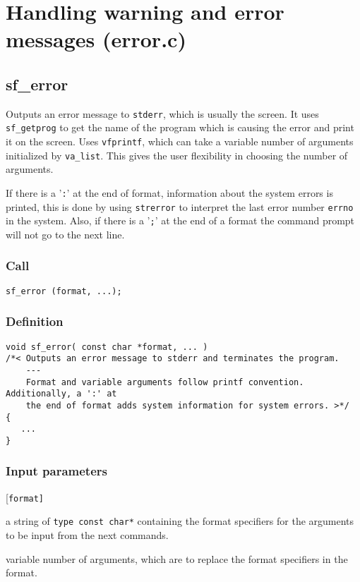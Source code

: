 \section{Handling warning and error messages (error.c)}




\subsection{{sf\_error}}\label{sec:sf_error}
Outputs an error message to \texttt{stderr}, which is usually the screen. It uses \texttt{sf\_getprog} to get the name of the program which is causing the error and print it on the screen.  Uses \texttt{vfprintf}, which can take a variable number of arguments initialized by \texttt{va\_list}. This gives the user flexibility in choosing the number of arguments.

If there is a '\texttt{:}' at the end of format, information about the system errors is printed, this is done by using \texttt{strerror} to interpret the last error number \texttt{errno} in the system. Also, if there is a '\texttt{;}' at the end of a format the command prompt will not go to the next line.

\subsubsection*{Call}
\begin{verbatim}sf_error (format, ...);\end{verbatim}

\subsubsection*{Definition}
\begin{verbatim}
void sf_error( const char *format, ... )
/*< Outputs an error message to stderr and terminates the program. 
    ---
    Format and variable arguments follow printf convention. Additionally, a ':' at
    the end of format adds system information for system errors. >*/
{
   ...
}
\end{verbatim}

\subsubsection*{Input parameters}
\begin{desclist}{\tt }{\quad}[\tt format]
   \setlength\itemsep{0pt}
   \item[format] a string of \texttt{type \texttt{const char*}} containing the format specifiers for the arguments to be input from the next commands.
   \item[...]    variable number of arguments, which are to replace the format specifiers in the format.    
\end{desclist}

